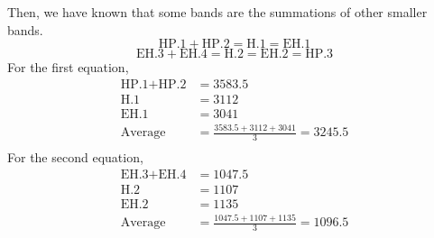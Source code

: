 \documentclass{article}
\begin{document}
            Then, we have known that some bands are the summations of other smaller bands.
            $$\text{HP.1} + \text{HP.2} = \text{H.1} = \text{EH.1}$$
            $$\text{EH.3} + \text{EH.4} = \text{H.2} = \text{EH.2} = \text{HP.3}$$
            For the first equation,
            $$\begin{aligned}
            \text{HP.1} + \text{HP.2} &= 3583.5\\
            \text{H.1} &= 3112\\
            \text{EH.1} &= 3041\\
            \text{Average} &= \frac{3583.5 + 3112 + 3041}{3} = 3245.5\\
            \end{aligned}$$
            For the second equation,
            $$\begin{aligned}
            \text{EH.3} + \text{EH.4} &= 1047.5\\
            \text{H.2} &= 1107\\
            \text{EH.2} &= 1135\\
            \text{Average} &= \frac{1047.5 + 1107 + 1135}{3} = 1096.5\\
            \end{aligned}$$
\end{document}
